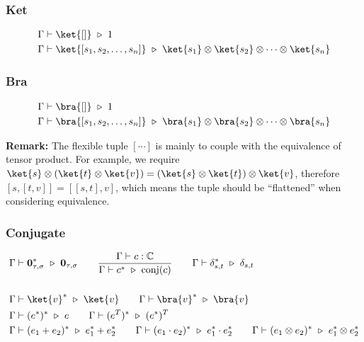 \subsubsection*{Ket}
\begin{align*}
  & \Gamma \vdash \ket{[]} \ \triangleright\ 1 \\
  & \Gamma \vdash \ket{[s_1, s_2, \dots, s_n]} \ \triangleright\ \ket{s_1} \otimes \ket{s_2} \otimes \cdots \otimes \ket{s_n}
\end{align*}

\subsubsection*{Bra}
\begin{align*}
  & \Gamma \vdash \bra{[]} \ \triangleright\ 1 \\
  & \Gamma \vdash \bra{[s_1, s_2, \dots, s_n]} \ \triangleright\ \bra{s_1} \otimes \bra{s_2} \otimes \cdots \otimes \bra{s_n}
\end{align*}

\textbf{Remark: } The flexible tuple $[\cdots]$ is mainly to couple with the equivalence of tensor product. For example, we require $\ket{s} \otimes (\ket{t} \otimes \ket{v}) = (\ket{s} \otimes \ket{t}) \otimes \ket{v}$, therefore $[s, [t, v]] = [[s, t], v]$, which means the tuple should be ``flattened'' when considering equivalence.

\subsubsection*{Conjugate}
\begin{align*}
  & \Gamma \vdash \textbf{0}_{\tau, \sigma}^* \ \triangleright\ \textbf{0}_{\tau, \sigma}
  \qquad 
  \frac{\Gamma \vdash c : \mathbb{C}}{\Gamma \vdash c^* \ \triangleright\ \mathrm{conj}(c)}
  \qquad 
  \Gamma \vdash \delta_{s,t}^* \ \triangleright\ \delta_{s,t}\\
  &\ \\
  & \Gamma \vdash \ket{v}^* \ \triangleright\ \ket{v}
  \qquad 
  \Gamma \vdash \bra{v}^* \ \triangleright\ \bra{v} \\
  & \Gamma \vdash (e^*)^*\ \triangleright\ e
  \qquad 
  \Gamma \vdash (e^T)^* \ \triangleright\ (e^*)^T\\
  & \Gamma \vdash (e_1 + e_2)^* \ \triangleright\ e_1^* + e_2^* 
  \qquad \Gamma \vdash (e_1 \cdot e_2)^* \ \triangleright\ e_1^* \cdot e_2^* 
  \qquad \Gamma \vdash (e_1 \otimes e_2)^* \ \triangleright\ e_1^* \otimes e_2^*
\end{align*}


